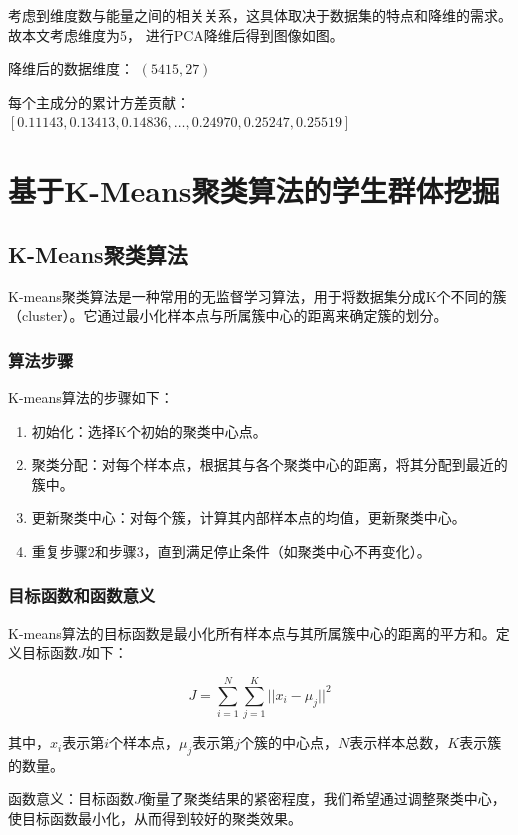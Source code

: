 \documentclass{article}
\begin{document}
考虑到维度数与能量之间的相关关系，这具体取决于数据集的特点和降维的需求。故本文考虑维度为5，
进行PCA降维后得到图像如图。

降维后的数据维度： $(5415, 27)$

每个主成分的累计方差贡献：$[0.11143, 0.13413, 0.14836, \dots, 0.24970, 0.25247, 0.25519]$

\section{基于K-Means聚类算法的学生群体挖掘}

\subsection{K-Means聚类算法}

K-means聚类算法是一种常用的无监督学习算法，用于将数据集分成K个不同的簇（cluster）。它通过最小化样本点与所属簇中心的距离来确定簇的划分。

\subsubsection{算法步骤}

K-means算法的步骤如下：

\begin{enumerate}
  \item 初始化：选择K个初始的聚类中心点。
  \item 聚类分配：对每个样本点，根据其与各个聚类中心的距离，将其分配到最近的簇中。
  \item 更新聚类中心：对每个簇，计算其内部样本点的均值，更新聚类中心。
  \item 重复步骤2和步骤3，直到满足停止条件（如聚类中心不再变化）。
\end{enumerate}

\subsubsection{目标函数和函数意义}

K-means算法的目标函数是最小化所有样本点与其所属簇中心的距离的平方和。定义目标函数$J$如下：

\[
J = \sum_{i=1}^{N} \sum_{j=1}^{K} ||x_i - \mu_j||^2
\]

其中，$x_i$表示第$i$个样本点，$\mu_j$表示第$j$个簇的中心点，$N$表示样本总数，$K$表示簇的数量。

函数意义：目标函数$J$衡量了聚类结果的紧密程度，我们希望通过调整聚类中心，使目标函数最小化，从而得到较好的聚类效果。
\end{document}
